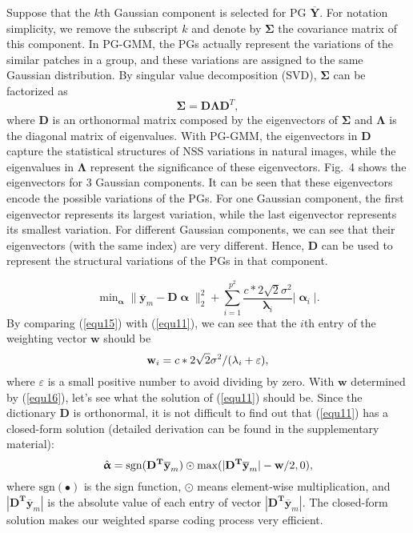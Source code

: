 \documentclass[10pt,twocolumn,letterpaper]{article}
\begin{document}
Suppose that the $k$th Gaussian component is selected for PG $\mathbf{\overline{Y}}$. For notation simplicity, we remove the subscript $k$ and denote by $\mathbf{\Sigma}$ the covariance matrix of this component. In PG-GMM, the PGs actually represent the variations of the similar patches in a group, and these variations are assigned to the same Gaussian distribution. By singular value decomposition (SVD), $\mathbf{\Sigma}$ can be factorized as
\begin{equation}\label{equ10}
\mathbf{\Sigma} = \mathbf{D}\mathbf{\Lambda}\mathbf{D}^{T},
\end{equation}
where $\mathbf{D}$ is an orthonormal matrix composed by the eigenvectors of $\mathbf{\Sigma}$ and $\mathbf{\Lambda}$ is the diagonal matrix of eigenvalues. With PG-GMM, the eigenvectors  in $\mathbf{D}$ capture the statistical structures of NSS variations in natural images, while the eigenvalues in $\mathbf{\Lambda}$ represent the significance of these eigenvectors. Fig.\ 4 shows the eigenvectors for 3 Gaussian components. It can be seen that these eigenvectors encode the possible variations of the PGs. For one Gaussian component, the first eigenvector represents its largest variation, while the last eigenvector represents its smallest variation. For different Gaussian components, we can see that their eigenvectors (with the same index) are very different. Hence, $\mathbf{D}$ can be used to represent the structural variations of the PGs in that component.

\begin{equation}\label{equ15}
\min\nolimits_{\boldsymbol{\upalpha}}\|\mathbf{\overline{y}}_{m}-\mathbf{D}\boldsymbol{\upalpha}\|_{2}^{2}+\sum_{i=1}^{p^{2}}\frac{c*2\sqrt{2}\sigma^{2}}{\mathbf{\lambda}_{i}}|\boldsymbol{\upalpha}_{i}|.
\end{equation}
By comparing (\ref{equ15}) with (\ref{equ11}), we can see that the $i$th entry of the weighting vector $\mathbf{w}$ should be
\begin{equation}\label{equ16}
\setlength{\abovedisplayskip}{3pt}
\setlength{\belowdisplayskip}{3pt}
\mathbf{w}_{i} = c*2\sqrt{2}\sigma^{2}/(\mathbf{\lambda}_{i}+\varepsilon),
\end{equation}
where $\varepsilon$ is a small positive number to avoid dividing by zero. With $\mathbf{w}$ determined by (\ref{equ16}), let's see what the solution of (\ref{equ11}) should be. Since the dictionary $\mathbf{D}$ is orthonormal, it is not difficult to find out that (\ref{equ11}) has a closed-form solution (detailed derivation can be found in the supplementary material):
\begin{equation}\label{equ17}
\setlength{\abovedisplayskip}{3pt}
\setlength{\belowdisplayskip}{4pt}
\hat{\boldsymbol{\upalpha}}= \text{sgn}(\mathbf{D^{T}\overline{y}}_{m})\odot \text{max}(|\mathbf{D^{T}\overline{y}}_{m}|-\mathbf{w}/2,0),
\end{equation}
where $\text{sgn}(\bullet)$ is the sign function, $\odot$ means element-wise multiplication, and $|\mathbf{D^{T}\overline{y}}_{m}|$ is the absolute value of each entry of vector $|\mathbf{D^{T}\overline{y}}_{m}|$. The closed-form solution makes our weighted sparse coding process very efficient. 
\vspace{-0.05in}
\end{document}
